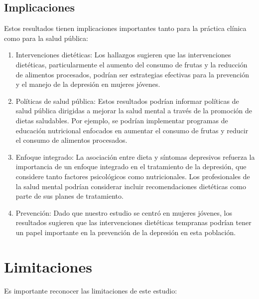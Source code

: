 \documentclass[stu, 12pt]{apa7}
\begin{document}
	\subsection{Implicaciones}\label{implicaciones}

	Estos resultados tienen implicaciones importantes tanto para la práctica
	clínica como para la salud pública:

	\begin{enumerate}
		\item Intervenciones dietéticas: Los hallazgos sugieren que las intervenciones dietéticas, particularmente el aumento del consumo de frutas y la reducción de alimentos procesados, podrían ser estrategias efectivas para la prevención y el manejo de la depresión en mujeres jóvenes.
		\item Políticas de salud pública: Estos resultados podrían informar políticas de salud pública dirigidas a mejorar la salud mental a través de la promoción de dietas saludables. Por ejemplo, se podrían implementar programas de educación nutricional enfocados en aumentar el consumo de frutas y reducir el consumo de alimentos procesados.
		\item Enfoque integrado: La asociación entre dieta y síntomas depresivos refuerza la importancia de un enfoque integrado en el tratamiento de la depresión, que considere tanto factores psicológicos como nutricionales. Los profesionales de la salud mental podrían considerar incluir recomendaciones dietéticas como parte de sus planes de tratamiento.
		\item Prevención: Dado que nuestro estudio se centró en mujeres jóvenes, los resultados sugieren que las intervenciones dietéticas tempranas podrían tener un papel importante en la prevención de la depresión en esta población.
	\end{enumerate}


	\section{Limitaciones}\label{limitaciones}

	Es importante reconocer las limitaciones de este estudio:
\end{document}
